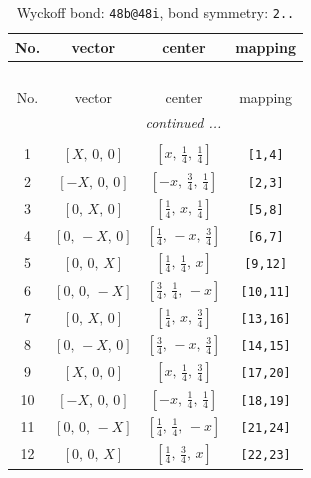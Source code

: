 \documentclass[fleqn,8pt]{jsarticle}
\begin{document}
\begin{longtable}{cccc}
\caption{Wyckoff bond: {\tt 48b@48i}, bond symmetry: {\tt 2..}}
 \\
 \hline \hline
No. & vector & center & mapping \\ \hline \endfirsthead

\multicolumn{3}{l}{\tablename\ \thetable{}} \\
 \hline \hline
No. & vector & center & mapping \\ \hline \endhead

 \hline \hline
\multicolumn{3}{r}{\footnotesize\it continued ...} \\ \endfoot

 \hline \hline
\multicolumn{3}{r}{} \\ \endlastfoot

1 & $\left[ X,\, 0,\, 0 \right]$ & $\left[ x,\, \frac{1}{4},\, \frac{1}{4} \right]$ & {\tt [1,4]} \\ \hline
2 & $\left[ - X,\, 0,\, 0 \right]$ & $\left[ - x,\, \frac{3}{4},\, \frac{1}{4} \right]$ & {\tt [2,3]} \\ \hline
3 & $\left[ 0,\, X,\, 0 \right]$ & $\left[ \frac{1}{4},\, x,\, \frac{1}{4} \right]$ & {\tt [5,8]} \\ \hline
4 & $\left[ 0,\, - X,\, 0 \right]$ & $\left[ \frac{1}{4},\, - x,\, \frac{3}{4} \right]$ & {\tt [6,7]} \\ \hline
5 & $\left[ 0,\, 0,\, X \right]$ & $\left[ \frac{1}{4},\, \frac{1}{4},\, x \right]$ & {\tt [9,12]} \\ \hline
6 & $\left[ 0,\, 0,\, - X \right]$ & $\left[ \frac{3}{4},\, \frac{1}{4},\, - x \right]$ & {\tt [10,11]} \\ \hline
7 & $\left[ 0,\, X,\, 0 \right]$ & $\left[ \frac{1}{4},\, x,\, \frac{3}{4} \right]$ & {\tt [13,16]} \\ \hline
8 & $\left[ 0,\, - X,\, 0 \right]$ & $\left[ \frac{3}{4},\, - x,\, \frac{3}{4} \right]$ & {\tt [14,15]} \\ \hline
9 & $\left[ X,\, 0,\, 0 \right]$ & $\left[ x,\, \frac{1}{4},\, \frac{3}{4} \right]$ & {\tt [17,20]} \\ \hline
10 & $\left[ - X,\, 0,\, 0 \right]$ & $\left[ - x,\, \frac{1}{4},\, \frac{1}{4} \right]$ & {\tt [18,19]} \\ \hline
11 & $\left[ 0,\, 0,\, - X \right]$ & $\left[ \frac{1}{4},\, \frac{1}{4},\, - x \right]$ & {\tt [21,24]} \\ \hline
12 & $\left[ 0,\, 0,\, X \right]$ & $\left[ \frac{1}{4},\, \frac{3}{4},\, x \right]$ & {\tt [22,23]} \\
\end{longtable}
\end{document}
